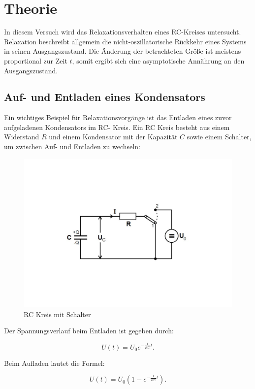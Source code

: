\section{Theorie}
\label{sec:Theorie}

In diesem Versuch wird das Relaxationsverhalten eines RC-Kreises untersucht.
Relaxation beschreibt allgemein die nicht-oszillatorische Rückkehr eines Systems in seinen Ausgangszustand.
Die Änderung der betrachteten Größe ist meistens proportional zur Zeit $t$, somit ergibt sich eine asymptotische
Annährung an den Ausgangszustand.\cite{v353}

\subsection{Auf- und Entladen eines Kondensators}
Ein wichtiges Beispiel für Relaxationsvorgänge ist das Entladen eines zuvor aufgeladenen Kondensators im RC- Kreis.
Ein RC Kreis besteht aus einem Widerstand $R$ und einem Kondensator mit der Kapazität $C$ sowie einem Schalter, um zwischen 
Auf- und Entladen zu wechseln:
\begin{figure}
    \centering
    \includegraphics[height=8cm]{content/Theorie - RC-Kreis.pdf}
    \caption{RC Kreis mit Schalter \cite{v353}}
    \label{fig:Theorie - RC_Kreis}
\end{figure}

Der Spannungsverlauf beim Entladen ist gegeben durch:

\begin{equation}
    U(t)= U_{0}e^{-\frac{1}{RC}t} . \label{eqn:Entladen}
\end{equation}

Beim Aufladen lautet die Formel:

\begin{equation}
    U(t)= U_{0}(1-e^{-\frac{1}{RC}t}) . \label{eqn:Aufladen}
\end{equation}

